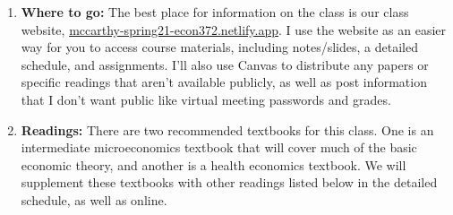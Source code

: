 \documentclass[11pt,]{article}
\begin{document}
\begin{enumerate}
\def\labelenumi{\arabic{enumi}.}
\item
  \textbf{Where to go:} The best place for information on the class is
  our class website,
  \href{https://mccarthy-spring21-econ372.netlify.app/}{mccarthy-spring21-econ372.netlify.app}.
  I use the website as an easier way for you to access course materials,
  including notes/slides, a detailed schedule, and assignments. I'll
  also use Canvas to distribute any papers or specific readings that
  aren't available publicly, as well as post information that I don't
  want public like virtual meeting passwords and grades.
\item
  \textbf{Readings:} There are two recommended textbooks for this class.
  One is an intermediate microeconomics textbook that will cover much of
  the basic economic theory, and another is a health economics textbook.
  We will supplement these textbooks with other readings listed below in
  the detailed schedule, as well as online.


\end{enumerate}
\end{document}
